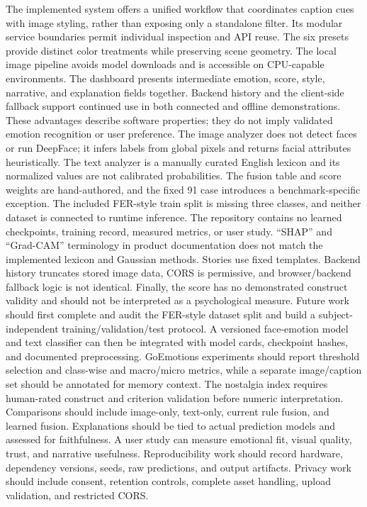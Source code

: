 \documentclass[conference]{IEEEtran}
\begin{document}
{}
\markdownRendererSectionEnd 
\markdownRendererSectionEnd \markdownRendererSectionBegin
{}\markdownRendererInterblockSeparator
{}The implemented system offers a unified workflow that coordinates caption cues with image styling, rather than exposing only a standalone filter. Its modular service boundaries permit individual inspection and API reuse. The six presets provide distinct color treatments while preserving scene geometry. The local image pipeline avoids model downloads and is accessible on CPU-capable environments. The dashboard presents intermediate emotion, score, style, narrative, and explanation fields together. Backend history and the client-side fallback support continued use in both connected and offline demonstrations. These advantages describe software properties; they do not imply validated emotion recognition or user preference.\markdownRendererInterblockSeparator
{}
\markdownRendererSectionEnd \markdownRendererSectionBegin
{}\markdownRendererInterblockSeparator
{}The image analyzer does not detect faces or run DeepFace; it infers labels from global pixels and returns facial attributes heuristically. The text analyzer is a manually curated English lexicon and its normalized values are not calibrated probabilities. The fusion table and score weights are hand-authored, and the fixed 91 case introduces a benchmark-specific exception. The included FER-style train split is missing three classes, and neither dataset is connected to runtime inference. The repository contains no learned checkpoints, training record, measured metrics, or user study. “SHAP” and “Grad-CAM” terminology in product documentation does not match the implemented lexicon and Gaussian methods. Stories use fixed templates. Backend history truncates stored image data, CORS is permissive, and browser/backend fallback logic is not identical. Finally, the score has no demonstrated construct validity and should not be interpreted as a psychological measure.\markdownRendererInterblockSeparator
{}
\markdownRendererSectionEnd \markdownRendererSectionBegin
{}\markdownRendererInterblockSeparator
{}Future work should first complete and audit the FER-style dataset split and build a subject-independent training/validation/test protocol. A versioned face-emotion model and text classifier can then be integrated with model cards, checkpoint hashes, and documented preprocessing. GoEmotions experiments should report threshold selection and class-wise and macro/micro metrics, while a separate image/caption set should be annotated for memory context. The nostalgia index requires human-rated construct and criterion validation before numeric interpretation. Comparisons should include image-only, text-only, current rule fusion, and learned fusion. Explanations should be tied to actual prediction models and assessed for faithfulness. A user study can measure emotional fit, visual quality, trust, and narrative usefulness. Reproducibility work should record hardware, dependency versions, seeds, raw predictions, and output artifacts. Privacy work should include consent, retention controls, complete asset handling, upload validation, and restricted CORS.\markdownRendererInterblockSeparator
\end{document}
